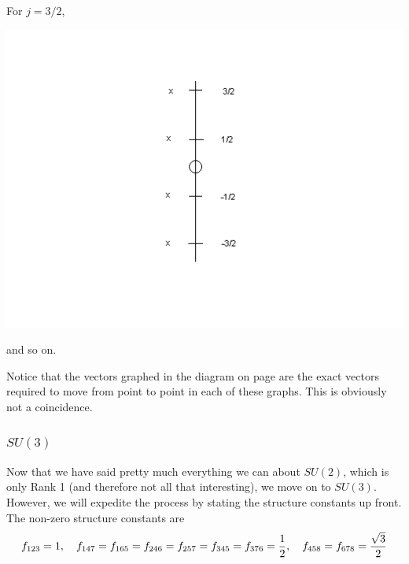 \documentclass[12pt,epsf]{article}
\def\nolabel{\nonumber }
\def\nolabel{\nonumber }
\begin{document}
\newpage
For $j={3/2}$,
\begin{center}
\includegraphics[scale = .7]{su3jthreehalf.PNG}
\end{center}
and so on.  

Notice that the vectors graphed in the diagram on page
\pageref{su2picture} are the exact vectors required to move from point
to point in each of these graphs.  This is obviously not a coincidence. 

\subsubsection{$SU(3)$}
\label{sec:su3}

Now that we have said pretty much everything we can about $SU(2)$,
which is only Rank 1 (and therefore not all that interesting), we
move on to $SU(3)$.  However, we will expedite the process by stating
the structure constants up front. The non-zero structure constants are 
\begin{eqnarray}
f_{123}=1,\quad f_{147} = f_{165} = f_{246} = f_{257} = f_{345} =
f_{376} = {1\over 2}, \quad f_{458} = f_{678} = {\sqrt{3}\over
2}\nolabel
\end{eqnarray}
\end{document}
